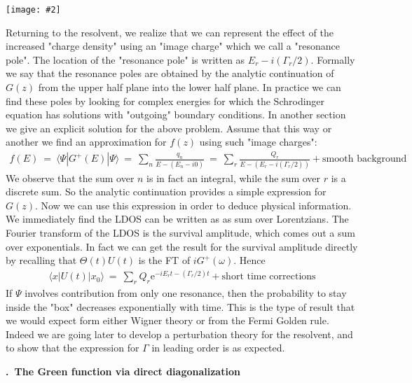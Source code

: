 \documentclass[onecolumn,fleqn, 11pt]{revtex4}
\newcommand{\eexp}{\mathrm{e}^}
\newcommand{\putgraph}[2][0.30\hsize]{\texttt{[image: \#2]}}
\newcommand{\beq}{\begin{eqnarray}}
\newcommand{\eeq}{\end{eqnarray}}
\renewcommand{\thesubsection}{\arabic{subsection}}
\renewcommand{\thesubsubsection}{\arabic{subsubsection}}
\newcommand{\sheadC}[1]
{
\addtocounter{subsubsection}{1}
\vspace{5mm}
{\bf \thesubsection.\thesubsubsection \ #1}  
\nopagebreak
\phantomsection
}
\begin{document}
\begin{center}
\putgraph[0.8\hsize]{ImageCharge} 
\end{center}


Returning to the resolvent, we realize that we can 
represent the effect of the increased "charge density"  
using an "image charge" which we call a "resonance pole". 
The location of the "resonance pole" is written as $E_r-i(\Gamma_r/2)$.
Formally we say that the resonance poles are 
obtained by the analytic continuation of $G(z)$ from the 
upper half plane into the lower half plane. 
In practice we can find these poles by looking for 
complex energies for which the Schrodinger equation 
has solutions with "outgoing" boundary conditions.    
In another section we give an explicit solution 
for the above problem. Assume that this way or another 
we find an approximation for $f(z)$ using such "image charges":
\beq
f(E) \ = \ \langle \Psi | G^{+}(E) | \Psi \rangle 
\ = \ \sum_n \frac{q_n}{E-(E_n-i0)} 
\ = \  \sum_r \frac{Q_r}{E-(E_r-i(\Gamma_r/2))}
+ \mbox{smooth background} 
\eeq
We observe that the sum over $n$ is in fact an integral, 
while the sum over $r$ is a discrete sum. 
So the analytic continuation provides a simple 
expression for $G(z)$. Now we can use this 
expression in order to deduce physical information. 
We immediately find the LDOS can 
be written as as sum over Lorentzians. 
The Fourier transform of the LDOS is the 
survival amplitude, which comes out a sum over 
exponentials. In fact we can get the result 
for the  survival amplitude directly by 
recalling that $\Theta(t)U(t)$ is the FT of $iG^{+}(\omega)$.  
Hence 
\beq
\langle x| U(t) | x_0 \rangle \ = \ 
\sum_r Q_r \eexp{ -iE_rt - (\Gamma_r/2)t }
+ \mbox{short time corrections} 
\eeq
If $\Psi$ involves contribution from only  
one resonance, then the probability to stay 
inside the "box"  decreases exponentially with time. 
This is the type of result that we would expect 
form either Wigner theory or from the Fermi Golden rule. 
Indeed we are going later to develop  
a perturbation theory for the resolvent, 
and to show that the expression for $\Gamma$ 
in leading order is as expected.



\sheadC{The Green function via direct diagonalization}
\end{document}
